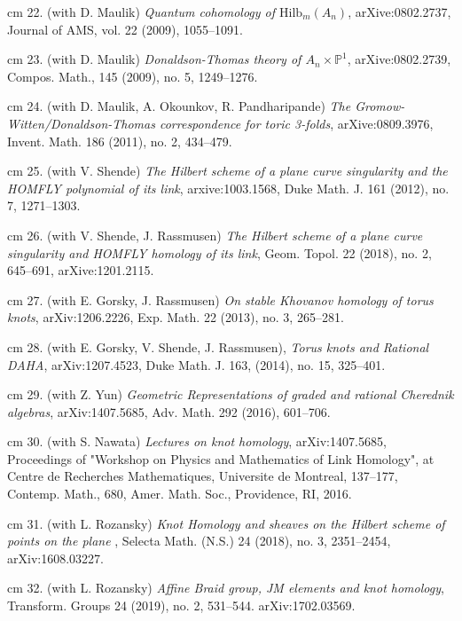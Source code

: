 \documentclass[11pt]{amsart}
\theoremstyle{plain}
\theoremstyle{definition}
\theoremstyle{remark}
\begin{document}
\noindent{} cm 22. (with D. Maulik) {\it Quantum cohomology of
$\mathrm{Hilb}_m(A_n)$}, arXive:0802.2737, Journal of AMS, vol. 22  (2009), 1055--1091. 

\noindent{} cm 23. (with D. Maulik) {\it Donaldson-Thomas theory
of $A_n\times\mathbb{P}^1$}, arXive:0802.2739,  Compos. Math., 145 (2009), no. 5, 1249--1276.

\noindent{} cm 24. (with D. Maulik, A. Okounkov, R. Pandharipande)
{\it The Gromow-Witten/Donaldson-Thomas correspondence for toric 3-folds},
arXive:0809.3976, Invent. Math. 186 (2011), no. 2, 434--479.

\noindent{} cm 25. (with V. Shende) 
{\it The Hilbert scheme of a plane curve singularity and the HOMFLY polynomial of its link}, arxive:1003.1568,
  Duke Math. J. 161 (2012), no. 7, 1271--1303.

\noindent{} cm 26. (with V. Shende, J. Rassmusen)
{\it The Hilbert scheme of a plane curve singularity and HOMFLY homology of its link},  Geom. Topol. 22 (2018), no. 2, 645--691, arXive:1201.2115.


\noindent{} cm 27. (with E. Gorsky, J. Rassmusen) {\it On stable Khovanov homology of torus knots},    arXiv:1206.2226,  Exp. Math. 22 (2013), no. 3, 265--281.

\noindent{} cm 28. (with E. Gorsky, V. Shende, J. Rassmusen), {\it Torus knots and Rational DAHA},   arXiv:1207.4523,  Duke Math. J. 163, (2014), no. 15, 325--401. 

\noindent{} cm 29. (with Z. Yun) {\it Geometric Representations of graded and rational Cherednik algebras},   arXiv:1407.5685,
 Adv. Math. 292 (2016), 601--706.

\noindent{} cm 30. (with S. Nawata) {\it Lectures on knot homology},   arXiv:1407.5685,   Proceedings of "Workshop on Physics and Mathematics of Link Homology", at Centre de Recherches Mathematiques, Universite de Montreal,  137--177, Contemp. Math., 680, Amer. Math. Soc., Providence, RI, 2016.


\noindent{} cm 31. (with L. Rozansky) {\it Knot Homology and sheaves on the Hilbert scheme of points on the plane },
Selecta Math. (N.S.) 24 (2018), no. 3, 2351--2454,  arXiv:1608.03227.



\noindent{} cm 32. (with L. Rozansky) {\it Affine Braid group, JM elements and knot homology},
Transform. Groups 24 (2019), no. 2, 531--544. arXiv:1702.03569.
\end{document}
